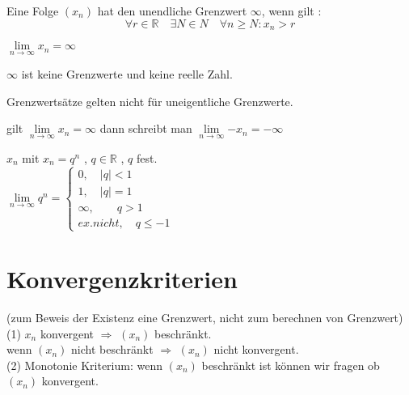 \begin{definition}
	Eine Folge $(x_n)$ hat den unendliche Grenzwert $\infty$, wenn gilt : \\
	\[\forall r \in \mathbb{R} \quad \exists N \in N \quad \forall n \geq N : x_n > r \]
	
	\begin{schreibweise}
		$\lim\limits_{n \rightarrow \infty}{x_n}= \infty$
	\end{schreibweise}
\end{definition}

\begin{remark}
	$\infty$ ist keine Grenzwerte und keine reelle Zahl.
\end{remark}

\begin{remark}
	Grenzwertsätze gelten nicht für uneigentliche Grenzwerte.
\end{remark}

\begin{remark}
	gilt $\lim\limits_{n \rightarrow \infty}{x_n}= \infty$ dann schreibt man $\lim\limits_{n \rightarrow \infty}{-x_n}= -\infty$
\end{remark}

\begin{example}
	$x_n$ mit $x_n = q^n$ , $q \in \mathbb{R}$ , $q$ fest.\\
	
	$ \lim\limits_{n \rightarrow \infty}{q^n} = \begin{cases}
	0 ,\quad |q|<1 \\
	1 ,\quad |q|=1 \\
	\infty ,\quad\quad q > 1  \\
	ex. nicht ,\quad q\leq -1
	\end{cases}$
\end{example}
\vfil

\section{Konvergenzkriterien}
(zum Beweis der Existenz eine Grenzwert, nicht zum berechnen von Grenzwert) \\


(1) $x_n$ konvergent $\Rightarrow$ $(x_n)$ beschränkt. \\

wenn $(x_n)$ nicht beschränkt $\Rightarrow$ $(x_n)$ nicht konvergent.\\


(2) Monotonie Kriterium:
wenn $(x_n)$ beschränkt ist können wir fragen ob $(x_n)$    konvergent.\\


